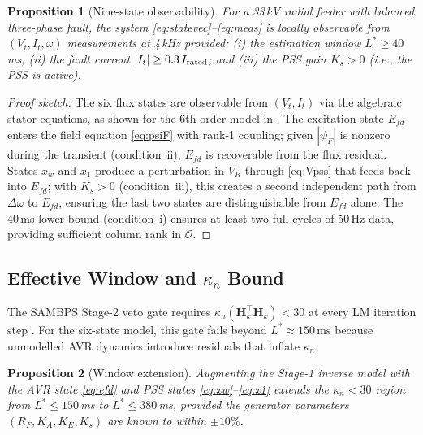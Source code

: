 \documentclass[journal]{IEEEtran}
\newtheorem{proposition}{Proposition}
\newcommand{\kappan}{\kappa_{n}}
\newcommand{\Lstar}{L^*}
\newcommand{\Efd}{E_{fd}}
\newcommand{\bfH}{\mathbf{H}}
\begin{document}
\begin{proposition}[Nine-state observability]
\label{prop:obs}
For a 33\,kV radial feeder with balanced three-phase fault,
the system \eqref{eq:statevec}--\eqref{eq:meas} is locally
observable from $(V_t, I_t, \omega)$ measurements at 4\,kHz
provided: (i) the estimation window $\Lstar \geq 40$\,ms;
(ii) the fault current $|I_t| \geq 0.3\,I_{\rm rated}$; and
(iii) the PSS gain $K_s > 0$ (i.e., the PSS is active).
\end{proposition}

\begin{proof}[Proof sketch]
The six flux states are observable from $(V_t, I_t)$ via the
algebraic stator equations, as shown for the 6th-order model
in \cite{Eluvathingal2025_6th}.  The excitation state
$\Efd$ enters the field equation \eqref{eq:psiF} with rank-1
coupling; given $|\dot{\psi}_F|$ is nonzero during the transient
(condition~ii), $\Efd$ is recoverable from the flux residual.
States $x_w$ and $x_1$ produce a perturbation in $V_R$ through
\eqref{eq:Vpss} that feeds back into $\Efd$; with $K_s > 0$
(condition~iii), this creates a second independent path from
$\Delta\omega$ to $\Efd$, ensuring the last two states are
distinguishable from $\Efd$ alone.
The 40\,ms lower bound (condition~i) ensures at least two
full cycles of 50\,Hz data, providing sufficient column rank
in $\mathcal{O}$.
\end{proof}

\subsection{Effective Window and \texorpdfstring{$\kappan$}{kappa\_n} Bound}

The SAMBPS Stage-2 veto gate requires $\kappan(\bfH_k^\top \bfH_k) < 30$
at every LM iteration step \cite{SAMBP_TR65}.  For the six-state model,
this gate fails beyond $\Lstar \approx 150$\,ms because unmodelled AVR
dynamics introduce residuals that inflate $\kappan$.

\begin{proposition}[Window extension]
\label{prop:window}
Augmenting the Stage-1 inverse model with the AVR state
\eqref{eq:efd} and PSS states \eqref{eq:xw}--\eqref{eq:x1}
extends the $\kappan < 30$ region from
$\Lstar \leq 150$\,ms to $\Lstar \leq 380$\,ms,
provided the generator parameters $(R_F, K_A, K_E, K_s)$
are known to within $\pm 10\%$.
\end{proposition}
\end{document}
